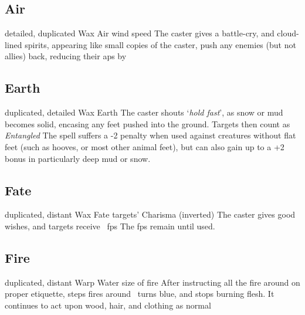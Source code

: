 \begin{multicols}{2}

\subsection{Air}

  {detailed, duplicated}%
  {Wax}%
  {Air}%
  {wind speed}%
  {The caster gives a battle-cry, and cloud-lined spirits, appearing like small copies of the caster, push any enemies (but not allies) back, reducing their \glspl{ap} by }%
  {}


\subsection{Earth}

  {duplicated, detailed}%
  {Wax}%
  {Earth}%
  {}%
  {The caster shouts `\textit{hold fast}', as snow or mud becomes solid, encasing any feet pushed into the ground.
  Targets then count as \textit{Entangled}}%
  {
  The spell suffers a -2 penalty when used against creatures without flat feet (such as hooves, or most other animal feet), but can also gain up to a +2 bonus in particularly deep mud or snow.}


\subsection{Fate}

  {duplicated, distant}%
  {Wax}%
  {Fate}%
  {targets' Charisma (inverted)}%
  {The caster gives good wishes, and  targets receive \showDam~\glspl{fp}}%
  {The \glspl{fp} remain until used.}


\subsection{Fire}


  {duplicated, distant}%
  {Warp}%
  {Water}%
  {size of fire}%
  {After instructing all the fire around on proper etiquette,  \glspl{step} fires around \spellRange\ turns blue, and stops burning flesh.
  It continues to act upon wood, hair, and clothing as normal}%
  {}


\end{multicols}
